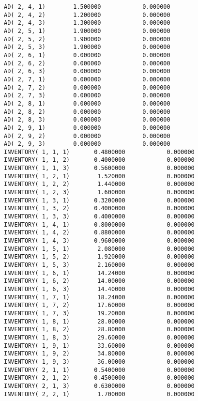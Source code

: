\documentclass[12pt]{article}
\begin{document}
\begin{appendices}
\begin{lstlisting}
AD( 2, 4, 1)        1.500000            0.000000
AD( 2, 4, 2)        1.200000            0.000000
AD( 2, 4, 3)        1.300000            0.000000
AD( 2, 5, 1)        1.900000            0.000000
AD( 2, 5, 2)        1.900000            0.000000
AD( 2, 5, 3)        1.900000            0.000000
AD( 2, 6, 1)        0.000000            0.000000
AD( 2, 6, 2)        0.000000            0.000000
AD( 2, 6, 3)        0.000000            0.000000
AD( 2, 7, 1)        0.000000            0.000000
AD( 2, 7, 2)        0.000000            0.000000
AD( 2, 7, 3)        0.000000            0.000000
AD( 2, 8, 1)        0.000000            0.000000
AD( 2, 8, 2)        0.000000            0.000000
AD( 2, 8, 3)        0.000000            0.000000
AD( 2, 9, 1)        0.000000            0.000000
AD( 2, 9, 2)        0.000000            0.000000
AD( 2, 9, 3)        0.000000            0.000000
INVENTORY( 1, 1, 1)       0.4800000            0.000000
INVENTORY( 1, 1, 2)       0.4000000            0.000000
INVENTORY( 1, 1, 3)       0.5600000            0.000000
INVENTORY( 1, 2, 1)        1.520000            0.000000
INVENTORY( 1, 2, 2)        1.440000            0.000000
INVENTORY( 1, 2, 3)        1.600000            0.000000
INVENTORY( 1, 3, 1)       0.3200000            0.000000
INVENTORY( 1, 3, 2)       0.4000000            0.000000
INVENTORY( 1, 3, 3)       0.4000000            0.000000
INVENTORY( 1, 4, 1)       0.8000000            0.000000
INVENTORY( 1, 4, 2)       0.8800000            0.000000
INVENTORY( 1, 4, 3)       0.9600000            0.000000
INVENTORY( 1, 5, 1)        2.080000            0.000000
INVENTORY( 1, 5, 2)        1.920000            0.000000
INVENTORY( 1, 5, 3)        2.160000            0.000000
INVENTORY( 1, 6, 1)        14.24000            0.000000
INVENTORY( 1, 6, 2)        14.00000            0.000000
INVENTORY( 1, 6, 3)        14.40000            0.000000
INVENTORY( 1, 7, 1)        18.24000            0.000000
INVENTORY( 1, 7, 2)        17.60000            0.000000
INVENTORY( 1, 7, 3)        19.20000            0.000000
INVENTORY( 1, 8, 1)        28.00000            0.000000
INVENTORY( 1, 8, 2)        28.80000            0.000000
INVENTORY( 1, 8, 3)        29.60000            0.000000
INVENTORY( 1, 9, 1)        33.60000            0.000000
INVENTORY( 1, 9, 2)        34.80000            0.000000
INVENTORY( 1, 9, 3)        36.00000            0.000000
INVENTORY( 2, 1, 1)       0.5400000            0.000000
INVENTORY( 2, 1, 2)       0.4500000            0.000000
INVENTORY( 2, 1, 3)       0.6300000            0.000000
INVENTORY( 2, 2, 1)        1.700000            0.000000

\end{lstlisting}
\end{appendices}
\end{document}
